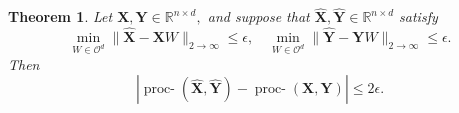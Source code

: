 \documentclass[12pt]{article}
\newcommand{\RR}{\mathbb{R}}
\newtheorem{thm}{Theorem}
\theoremstyle{definition}
\newcommand{\bX}{\mathbf{X}}
\newcommand{\bY}{\mathbf{Y}}
\newcommand{\procwphat}[1][2]{\mathop{\mbox{proc-$\hat{W}_#1$}}}
\begin{document}



\begin{thm}\label{thm:W1_continuous}
Let $\bX,\bY\in \RR^{n\times d},$ and suppose that $\hat{\bX}, \hat{\bY}\in \RR^{n\times d}$ satisfy $$ \min_{W\in \mathcal{O}^d}\|\hat{\bX}-\bX W\|_{2\rightarrow\infty}\leq \epsilon,\quad \min_{W\in\mathcal{O}^d}\|\hat{\bY}-\bY W\|_{2\rightarrow\infty}\leq \epsilon.$$ Then 
$$ |\procwphat[1](\hat{\bX},\hat{\bY})-\procwphat[1](\bX,\bY)|\leq 2\epsilon. $$
\end{thm}
\end{document}
